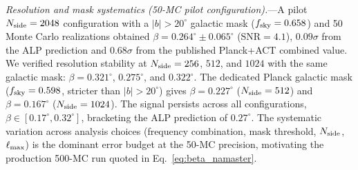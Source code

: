 \documentclass[aps,prd,twocolumn,superscriptaddress,showpacs,preprintnumbers,nofootinbib,longbibliography,floatfix]{revtex4-2}
\begin{document}
\textit{Resolution and mask systematics (50-MC pilot configuration).}---A pilot $N_{\rm side}=2048$ configuration with a $|b|>20^\circ$ galactic mask ($f_{\rm sky}=0.658$) and 50 Monte Carlo realizations obtained $\beta = 0.264^\circ \pm 0.065^\circ$ (SNR$=4.1$), $0.09\sigma$ from the ALP prediction and $0.68\sigma$ from the published Planck+ACT combined value. We verified resolution stability at $N_{\rm side} = 256$, $512$, and $1024$ with the same galactic mask: $\beta = 0.321^\circ$, $0.275^\circ$, and $0.322^\circ$. The dedicated Planck galactic mask ($f_{\rm sky} = 0.598$, stricter than $|b| > 20^\circ$) gives $\beta = 0.227^\circ$ ($N_{\rm side} = 512$) and $\beta = 0.167^\circ$ ($N_{\rm side} = 1024$). The signal persists across all configurations, $\beta \in [0.17^\circ, 0.32^\circ]$, bracketing the ALP prediction of $0.27^\circ$. The systematic variation across analysis choices (frequency combination, mask threshold, $N_{\rm side}$, $\ell_{\rm max}$) is the dominant error budget at the 50-MC precision, motivating the production 500-MC run quoted in Eq.~\eqref{eq:beta_namaster}.
\end{document}
